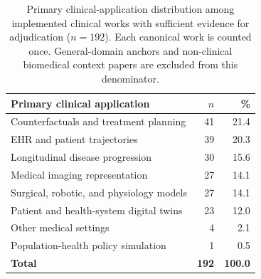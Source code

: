 \begin{table}[t]
\caption{Primary clinical-application distribution among implemented clinical works with sufficient evidence for adjudication ($n{=}192$). Each canonical work is counted once. General-domain anchors and non-clinical biomedical context papers are excluded from this denominator.}
\label{tab:tracks}
\centering
\small
\setlength{\tabcolsep}{6pt}
\renewcommand{\arraystretch}{1.08}
\begin{tabularx}{\linewidth}{@{}Xrr@{}}
\toprule
\textbf{Primary clinical application} & \textbf{$n$} & \textbf{\%} \\
\midrule
Counterfactuals and treatment planning & 41 & 21.4 \\
EHR and patient trajectories & 39 & 20.3 \\
Longitudinal disease progression & 30 & 15.6 \\
Medical imaging representation & 27 & 14.1 \\
Surgical, robotic, and physiology models & 27 & 14.1 \\
Patient and health-system digital twins & 23 & 12.0 \\
Other medical settings & 4 & 2.1 \\
Population-health policy simulation & 1 & 0.5 \\
\midrule
\textbf{Total} & \textbf{192} & \textbf{100.0} \\
\bottomrule
\end{tabularx}
\end{table}
